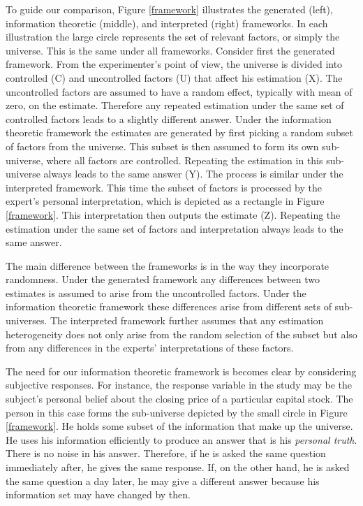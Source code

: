 \documentclass[11pt,twoside]{article}
\begin{document}
To guide our comparison, Figure \ref{framework} illustrates the generated (left), information theoretic (middle), and interpreted (right) frameworks. In each illustration the large circle represents the set of relevant factors, or simply the universe. This is the same under all frameworks. Consider first the generated framework. From the experimenter's point of view, the universe is divided into controlled (C) and uncontrolled factors (U) that affect his estimation (X). The uncontrolled factors are assumed to have a random effect, typically with mean of zero, on the estimate. Therefore any repeated estimation under the same set of controlled factors leads to a slightly different answer. Under the information theoretic framework the estimates are generated by first picking a random subset of factors from the universe. This subset is then assumed to form its own sub-universe, where all factors are controlled. Repeating the estimation in this sub-universe always leads to the same answer (Y). The process is similar under the interpreted framework. This time the subset of factors is processed by the expert's personal interpretation, which is depicted as a rectangle in Figure  \ref{framework}. This interpretation then outputs the estimate (Z). Repeating the estimation under the same set of factors and interpretation always leads to the same answer. 


The main difference between the frameworks is in the way they incorporate randomness. Under the generated framework any differences between two estimates is assumed to arise from the uncontrolled factors. Under the information theoretic framework these differences arise from different sets of sub-universes. The interpreted framework further assumes that any estimation heterogeneity does not only arise from the random selection of the subset but also from any differences in the experts' interpretations of these factors. 

The need for our information theoretic framework is becomes clear by considering subjective responses. For instance, the response variable in the study may be the subject's personal belief about the closing price of a particular capital stock. The person in this case forms the sub-universe depicted by the small circle in Figure \ref{framework}. He holds some subset of  the information that make up the universe. He uses his information efficiently to produce an answer that is his \textit{personal truth}. There is no noise in his answer. Therefore, if he is asked the same question immediately after, he gives the same response. If, on the other hand, he is asked the same question a day later, he may give a different answer because his information set may have changed by then. 
\end{document}
